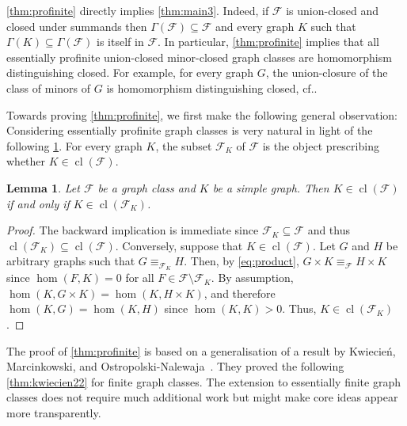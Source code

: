 \documentclass[3p,final]{elsarticle}
\DeclareMathOperator{\cl}{cl}
\newtheorem{lemma}[theorem]{Lemma}
\begin{document}
	\cref{thm:profinite} directly implies \cref{thm:main3}. Indeed, if $\mathcal{F}$ is union-closed and closed under summands then $\Gamma(\mathcal{F}) \subseteq \mathcal{F}$ and every graph $K$ such that $\Gamma(K) \subseteq \Gamma(\mathcal{F})$ is itself in $\mathcal{F}$.
	In particular, \cref{thm:profinite} implies that all essentially profinite union-closed minor-closed graph classes are homomorphism distinguishing closed.
	For example, for every graph $G$, the union-closure of the class of minors of $G$ is homomorphism distinguishing closed, cf.\@ \cite[Question~4]{roberson_oddomorphisms_2022}.
	


	Towards proving \cref{thm:profinite}, we first make the following general observation:
	Considering essentially profinite graph classes is very natural in light of the following \cref{lem:reduction}. For every graph $K$, the subset $\mathcal{F}_K$ of $\mathcal{F}$ is the object prescribing whether $K \in \cl(\mathcal{F})$.
	
	\begin{lemma} \label{lem:reduction}
		Let $\mathcal{F}$ be a graph class and $K$ be a simple  graph. 
		Then $K \in \cl(\mathcal{F})$ if and only if $K \in \cl(\mathcal{F}_K)$.
	\end{lemma}
	\begin{proof}The backward implication is immediate since $\mathcal{F}_K \subseteq \mathcal{F}$ and thus $\cl(\mathcal{F}_K) \subseteq \cl(\mathcal{F})$.
		Conversely, suppose that $K \in \cl(\mathcal{F})$. Let $G$ and $H$ be arbitrary graphs such that $G \equiv_{\mathcal{F}_K} H$.
		Then, by \cref{eq:product}, $G \times K \equiv_{\mathcal{F}} H \times K$ since $\hom(F, K) = 0$ for all $F \in \mathcal{F} \setminus \mathcal{F}_K$.
		By assumption, $\hom(K,G \times K) = \hom(K, H \times K)$, and therefore $\hom(K, G) = \hom(K, H)$ since $\hom(K, K) > 0$. Thus, $K \in \cl(\mathcal{F}_K)$.
	\end{proof}
	
	The proof of \cref{thm:profinite} is based on a generalisation of a result by Kwiecie{\'n}, Marcinkowski, and Ostropolski-Nalewaja~\cite{kwiecien_determinacy_2022}.
	They proved the following \cref{thm:kwiecien22} for finite graph classes.
	The extension to essentially finite graph classes does not require much additional work but might make core ideas appear more transparently.
	
\end{document}
